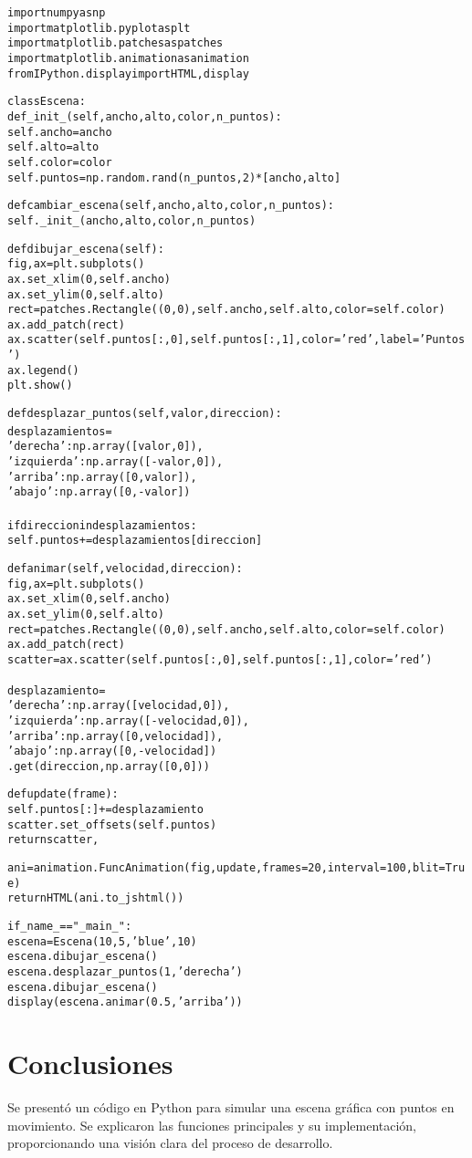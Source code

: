 \documentclass[a4paper, 10pt]{article}
\begin{document}
\begin{alltt}
import numpy as np
import matplotlib.pyplot as plt
import matplotlib.patches as patches
import matplotlib.animation as animation
from IPython.display import HTML, display

class Escena:
    def _init_(self, ancho, alto, color, n_puntos):
        self.ancho = ancho
        self.alto = alto
        self.color = color
        self.puntos = np.random.rand(n_puntos, 2) * [ancho, alto]

    def cambiar_escena(self, ancho, alto, color, n_puntos):
        self._init_(ancho, alto, color, n_puntos)

    def dibujar_escena(self):
        fig, ax = plt.subplots()
        ax.set_xlim(0, self.ancho)
        ax.set_ylim(0, self.alto)
        rect = patches.Rectangle((0, 0), self.ancho, self.alto, color=self.color)
        ax.add_patch(rect)
        ax.scatter(self.puntos[:, 0], self.puntos[:, 1], color='red', label='Puntos')
        ax.legend()
        plt.show()

    def desplazar_puntos(self, valor, direccion):
        desplazamientos = {
            'derecha': np.array([valor, 0]),
            'izquierda': np.array([-valor, 0]),
            'arriba': np.array([0, valor]),
            'abajo': np.array([0, -valor])
        }
        if direccion in desplazamientos:
            self.puntos += desplazamientos[direccion]

    def animar(self, velocidad, direccion):
        fig, ax = plt.subplots()
        ax.set_xlim(0, self.ancho)
        ax.set_ylim(0, self.alto)
        rect = patches.Rectangle((0, 0), self.ancho, self.alto, color=self.color)
        ax.add_patch(rect)
        scatter = ax.scatter(self.puntos[:, 0], self.puntos[:, 1], color='red')

        desplazamiento = {
            'derecha': np.array([velocidad, 0]),
            'izquierda': np.array([-velocidad, 0]),
            'arriba': np.array([0, velocidad]),
            'abajo': np.array([0, -velocidad])
        }.get(direccion, np.array([0, 0]))

        def update(frame):
            self.puntos[:] += desplazamiento
            scatter.set_offsets(self.puntos)
            return scatter,

        ani = animation.FuncAnimation(fig, update, frames=20, interval=100, blit=True)
        return HTML(ani.to_jshtml())

if _name_ == "_main_":
    escena = Escena(10, 5, 'blue', 10)
    escena.dibujar_escena()
    escena.desplazar_puntos(1, 'derecha')
    escena.dibujar_escena()
    display(escena.animar(0.5, 'arriba'))
\end{alltt}

\section{Conclusiones}
Se presentó un código en Python para simular una escena gráfica con puntos en movimiento. Se explicaron las funciones principales y su implementación, proporcionando una visión clara del proceso de desarrollo.
\end{document}

